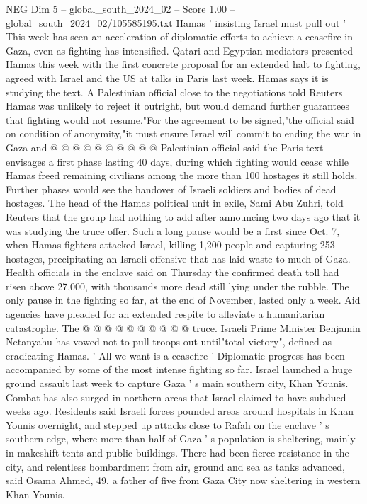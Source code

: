 \begin{textsample}{NEG Dim 5 – global\_south\_2024\_02 – Score 1.00 – global\_south\_2024\_02/105585195.txt}
Hamas ' insisting Israel must pull out ' This week has seen an acceleration of diplomatic efforts to achieve a ceasefire in Gaza, even as fighting has intensified.
Qatari and Egyptian mediators presented Hamas this week with the first concrete proposal for an extended halt to fighting, agreed with Israel and the US at talks in Paris last week.
Hamas says it is studying the text.
A Palestinian official close to the negotiations told Reuters Hamas was unlikely to reject it outright, but would demand further guarantees that fighting would not resume."For the agreement to be signed,"the official said on condition of anonymity,"it must ensure Israel will commit to ending the war in Gaza and @ @ @ @ @ @ @ @ @ @ Palestinian official said the Paris text envisages a first phase lasting 40 days, during which fighting would cease while Hamas freed remaining civilians among the more than 100 hostages it still holds.
Further phases would see the handover of Israeli soldiers and bodies of dead hostages.
The head of the Hamas political unit in exile, Sami Abu Zuhri, told Reuters that the group had nothing to add after announcing two days ago that it was studying the truce offer.
Such a long pause would be a first since Oct. 7, when Hamas fighters attacked Israel, killing 1,200 people and capturing 253 hostages, precipitating an Israeli offensive that has laid waste to much of Gaza.
Health officials in the enclave said on Thursday the confirmed death toll had risen above 27,000, with thousands more dead still lying under the rubble.
The only pause in the fighting so far, at the end of November, lasted only a week.
Aid agencies have pleaded for an extended respite to alleviate a humanitarian catastrophe.
The @ @ @ @ @ @ @ @ @ @ truce.
Israeli Prime Minister Benjamin Netanyahu has vowed not to pull troops out until"total victory", defined as eradicating Hamas. ' All we want is a ceasefire ' Diplomatic progress has been accompanied by some of the most intense fighting so far.
Israel launched a huge ground assault last week to capture Gaza ' s main southern city, Khan Younis.
Combat has also surged in northern areas that Israel claimed to have subdued weeks ago.
Residents said Israeli forces pounded areas around hospitals in Khan Younis overnight, and stepped up attacks close to Rafah on the enclave ' s southern edge, where more than half of Gaza ' s population is sheltering, mainly in makeshift tents and public buildings.
There had been fierce resistance in the city, and relentless bombardment from air, ground and sea as tanks advanced, said Osama Ahmed, 49, a father of five from Gaza City now sheltering in western Khan Younis.

\end{textsample}
